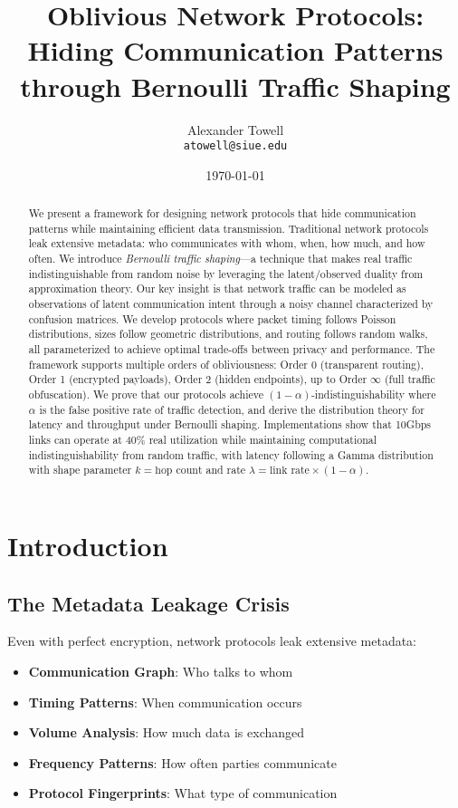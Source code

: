 \documentclass[11pt,final]{article}
\title{Oblivious Network Protocols:\\
\Large Hiding Communication Patterns through Bernoulli Traffic Shaping}
\author{
    Alexander Towell\\
    \texttt{atowell@siue.edu}
}
\date{\today}
\begin{document}
\maketitle

\begin{abstract}
We present a framework for designing network protocols that hide communication patterns while maintaining efficient data transmission. Traditional network protocols leak extensive metadata: who communicates with whom, when, how much, and how often. We introduce \emph{Bernoulli traffic shaping}—a technique that makes real traffic indistinguishable from random noise by leveraging the latent/observed duality from approximation theory. Our key insight is that network traffic can be modeled as observations of latent communication intent through a noisy channel characterized by confusion matrices. We develop protocols where packet timing follows Poisson distributions, sizes follow geometric distributions, and routing follows random walks, all parameterized to achieve optimal trade-offs between privacy and performance. The framework supports multiple orders of obliviousness: Order 0 (transparent routing), Order 1 (encrypted payloads), Order 2 (hidden endpoints), up to Order $\infty$ (full traffic obfuscation). We prove that our protocols achieve $(1-\alpha)$-indistinguishability where $\alpha$ is the false positive rate of traffic detection, and derive the distribution theory for latency and throughput under Bernoulli shaping. Implementations show that 10Gbps links can operate at 40\% real utilization while maintaining computational indistinguishability from random traffic, with latency following a Gamma distribution with shape parameter $k = \text{hop count}$ and rate $\lambda = \text{link rate} \times (1-\alpha)$.
\end{abstract}


\ObliviousNotationGuide

\section{Introduction}

\subsection{The Metadata Leakage Crisis}

Even with perfect encryption, network protocols leak extensive metadata:
\begin{itemize}
    \item \textbf{Communication Graph}: Who talks to whom
    \item \textbf{Timing Patterns}: When communication occurs
    \item \textbf{Volume Analysis}: How much data is exchanged
    \item \textbf{Frequency Patterns}: How often parties communicate
    \item \textbf{Protocol Fingerprints}: What type of communication
\end{itemize}
\end{document}
